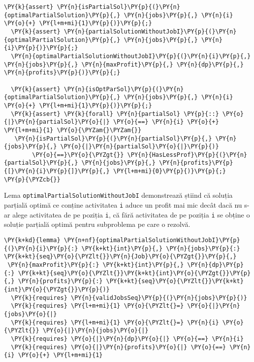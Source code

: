 \begin{itemize}
\begin{Verbatim}[commandchars=\\\{\},fontsize=\footnotesize]
  \PY{k}{assert} \PY{n}{isPartialSol}\PY{p}{(}\PY{n}{optimalPartialSolution}\PY{p}{,} \PY{n}{jobs}\PY{p}{,} \PY{n}{i} \PY{o}{+} \PY{l+m+mi}{1}\PY{p}{)}\PY{p}{;}
  \PY{k}{assert} \PY{n}{partialSolutionWithoutJobI}\PY{p}{(}\PY{n}{optimalPartialSolution}\PY{p}{,} \PY{n}{jobs}\PY{p}{,} \PY{n}{i}\PY{p}{)}\PY{p}{;}
  \PY{n}{optimalPartialSolutionWithoutJobI}\PY{p}{(}\PY{n}{i}\PY{p}{,} \PY{n}{jobs}\PY{p}{,} \PY{n}{maxProfit}\PY{p}{,} \PY{n}{dp}\PY{p}{,} \PY{n}{profits}\PY{p}{)}\PY{p}{;}

  \PY{k}{assert} \PY{n}{isOptParSol}\PY{p}{(}\PY{n}{optimalPartialSolution}\PY{p}{,} \PY{n}{jobs}\PY{p}{,} \PY{n}{i} \PY{o}{+} \PY{l+m+mi}{1}\PY{p}{)}\PY{p}{;}
  \PY{k}{assert} \PY{k}{forall} \PY{n}{partialSol} \PY{p}{::} \PY{o}{|}\PY{n}{partialSol}\PY{o}{|} \PY{o}{==} \PY{n}{i} \PY{o}{+} \PY{l+m+mi}{1} \PY{o}{\PYZam{}\PYZam{}}
   \PY{n}{isPartialSol}\PY{p}{(}\PY{n}{partialSol}\PY{p}{,} \PY{n}{jobs}\PY{p}{,} \PY{o}{|}\PY{n}{partialSol}\PY{o}{|}\PY{p}{)} 
        \PY{o}{==}\PY{o}{\PYZgt{}} \PY{n}{HasLessProf}\PY{p}{(}\PY{n}{partialSol}\PY{p}{,} \PY{n}{jobs}\PY{p}{,} \PY{n}{profits}\PY{p}{[}\PY{n}{i}\PY{p}{]}\PY{p}{,} \PY{l+m+mi}{0}\PY{p}{)}\PY{p}{;}
\PY{p}{\PYZcb{}}
\end{Verbatim}
Lema \texttt{optimalPartialSolutionWithoutJobI} demonstrează știind că soluția parțială optimă ce conține activitatea \texttt{i} aduce un profit mai mic decât dacă nu s-ar alege activitatea de pe poziția \texttt{i}, că fără activitatea de pe poziția \texttt{i} se obține o soluție parțială optimă pentru subproblema pe care o rezolvă.
\begin{Verbatim}[commandchars=\\\{\},fontsize=\footnotesize]
\PY{k+kd}{lemma} \PY{n+nf}{optimalPartialSolutionWithoutJobI}\PY{p}{(}\PY{n}{i}\PY{p}{:} \PY{k+kt}{int}\PY{p}{,} \PY{n}{jobs}\PY{p}{:} \PY{k+kt}{seq}\PY{o}{\PYZlt{}}\PY{n}{Job}\PY{o}{\PYZgt{}}\PY{p}{,}
 \PY{n}{maxProfit}\PY{p}{:} \PY{k+kt}{int}\PY{p}{,} \PY{n}{dp}\PY{p}{:} \PY{k+kt}{seq}\PY{o}{\PYZlt{}}\PY{k+kt}{int}\PY{o}{\PYZgt{}}\PY{p}{,} \PY{n}{profits}\PY{p}{:} \PY{k+kt}{seq}\PY{o}{\PYZlt{}}\PY{k+kt}{int}\PY{o}{\PYZgt{}}\PY{p}{)}
  \PY{k}{requires} \PY{n}{validJobsSeq}\PY{p}{(}\PY{n}{jobs}\PY{p}{)}
  \PY{k}{requires} \PY{l+m+mi}{1} \PY{o}{\PYZlt{}=} \PY{o}{|}\PY{n}{jobs}\PY{o}{|}
  \PY{k}{requires} \PY{l+m+mi}{1} \PY{o}{\PYZlt{}=} \PY{n}{i} \PY{o}{\PYZlt{}} \PY{o}{|}\PY{n}{jobs}\PY{o}{|}
  \PY{k}{requires} \PY{o}{|}\PY{n}{dp}\PY{o}{|} \PY{o}{==} \PY{n}{i}
  \PY{k}{requires} \PY{o}{|}\PY{n}{profits}\PY{o}{|} \PY{o}{==} \PY{n}{i} \PY{o}{+} \PY{l+m+mi}{1}

\end{Verbatim}
\end{itemize}
